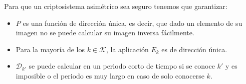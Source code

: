 Para que un criptosistema asimétrico sea seguro tenemos que garantizar:
\begin{itemize}
	\item $P$ es una función de dirección única, es decir, que dado un elemento de su imagen no se puede calcular su imagen inversa fácilmente.
	\item Para la mayoría de los $k \in \mathcal{K}$, la aplicación $E_k$ es de dirección única.
	\item $\mathcal{D}_{k'}$ se puede calcular en un periodo corto de tiempo si se conoce $k'$ y es imposible o el periodo es muy largo en caso de solo conocerse $k$.
\end{itemize}
